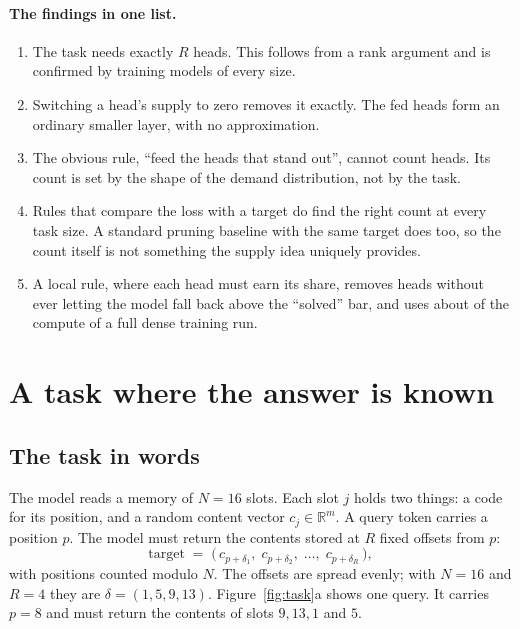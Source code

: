 \documentclass[11pt]{report}
\begin{document}
\paragraph{The findings in one list.}
\begin{enumerate}
\item The task needs exactly $R$ heads. This follows from a rank argument and is confirmed
      by training models of every size.
\item Switching a head's supply to zero removes it exactly. The fed heads form an
      ordinary smaller layer, with no approximation.
\item The obvious rule, ``feed the heads that stand out'', cannot count heads. Its count is
      set by the shape of the demand distribution, not by the task.
\item Rules that compare the loss with a target do find the right count at every task
      size. A standard pruning baseline with the same target does too, so the count
      itself is not something the supply idea uniquely provides.
\item A local rule, where each head must earn its share, removes heads without ever
      letting the model fall back above the ``solved'' bar, and uses about
      \thLocalCompute{} of the compute of a full dense training run.
\end{enumerate}

\section{A task where the answer is known}
\label{sec:task}

\subsection{The task in words}

The model reads a memory of $N = 16$ slots. Each slot $j$ holds two things: a code for its
position, and a random content vector $c_j \in \mathbb{R}^m$. A query token carries a
position $p$. The model must return the contents stored at $R$ fixed offsets from $p$:
\begin{equation}
  \text{target} \;=\; \bigl(\, c_{p+\delta_1},\; c_{p+\delta_2},\; \dots,\; c_{p+\delta_R} \,\bigr),
  \label{eq:target}
\end{equation}
with positions counted modulo $N$. The offsets are spread evenly; with $N = 16$ and $R = 4$
they are $\delta = (1, 5, 9, 13)$. Figure~\ref{fig:task}a shows one query. It carries
$p = 8$ and must return the contents of slots $9, 13, 1$ and $5$.
\end{document}
